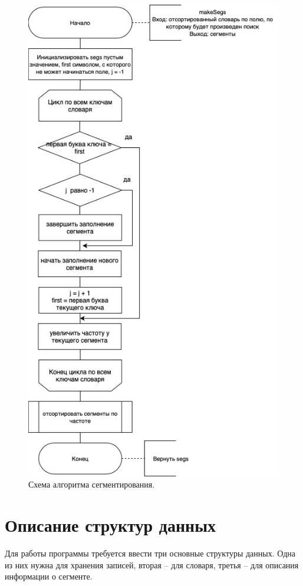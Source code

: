 \begin{figure}[H]
	\centering
	\includegraphics[scale=0.6]{inc/scheme-makeSegs.jpg}
	\caption{Схема алгоритма сегментирования.}
	\label{fig:seg}
\end{figure}

\section{Описание структур данных}
Для работы программы требуется ввести три основные структуры данных. Одна из них нужна для хранения записей, вторая -- для словаря, третья -- для описания информации о сегменте.


